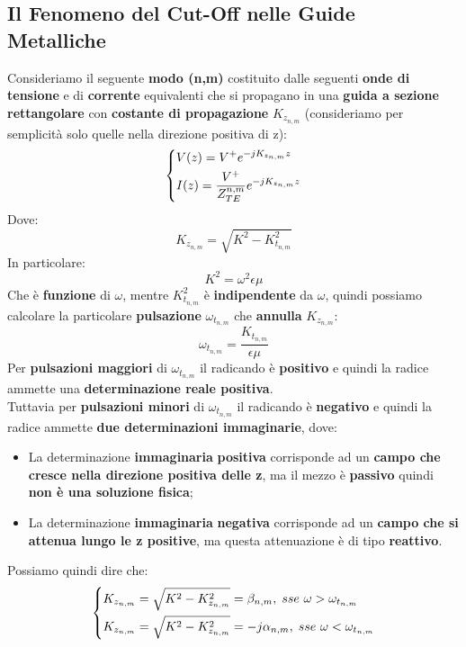 \subsection{Il Fenomeno del Cut-Off nelle Guide Metalliche}
Consideriamo il seguente \textbf{modo (n,m)} costituito dalle seguenti \textbf{onde di tensione} e di \textbf{corrente} equivalenti che si propagano in una \textbf{guida a sezione rettangolare} con \textbf{costante di propagazione} $K_{z_{n,m}}$ (consideriamo per semplicità solo quelle nella direzione positiva di z):
\begin{equation*}
\begin{dcases}
    V(z) = V^+ e^{-jK_{z_{n,m}}z}\\
    I(z) = \frac{V^+}{Z_{TE}^{n,m}} e^{-jK_{z_{n,m}}z}
\end{dcases}
\end{equation*}
Dove:
\begin{equation*}
    K_{z_{n,m}} = \sqrt{K^2 - K_{t_{n,m}}^2}
\end{equation*}
In particolare:
\begin{equation*}
    K^2 = \omega^2 \epsilon \mu 
\end{equation*}
Che è \textbf{funzione} di $\omega$, mentre $K^2_{t_{n,m}}$ è \textbf{indipendente} da $\omega$, quindi possiamo calcolare la particolare \textbf{pulsazione} $\omega_{t_{n,m}}$ che \textbf{annulla} $K_{z_{n,m}}$:
\begin{equation*}
    \omega_{t_{n,m}} = \frac{K_{t_{n,m}}}{\epsilon \mu}
\end{equation*}
Per \textbf{pulsazioni maggiori} di $\omega_{t_{n,m}}$ il radicando è \textbf{positivo} e quindi la radice ammette una \textbf{determinazione reale positiva}.\\ 
Tuttavia per \textbf{pulsazioni minori} di $\omega_{t_{n,m}}$ il radicando è \textbf{negativo} e quindi la radice ammette \textbf{due determinazioni immaginarie}, dove:
\begin{itemize}
    \item La determinazione \textbf{immaginaria} \textbf{positiva} corrisponde ad un \textbf{campo che cresce nella direzione positiva delle z}, ma il mezzo è \textbf{passivo} quindi \textbf{non è una soluzione fisica};
    \item La determinazione \textbf{immaginaria} \textbf{negativa} corrisponde ad un \textbf{campo che si attenua lungo le z positive}, ma questa attenuazione è di tipo \textbf{reattivo}.
\end{itemize}
Possiamo quindi dire che:
\begin{equation*}
\begin{dcases}
    K_{z_{n,m}} = \sqrt{K^2 - K_{z_{n,m}}^2} = \beta_{n,m},\; sse \ \omega > \omega_{t_{n,m}}\\
    K_{z_{n,m}} = \sqrt{K^2 - K_{z_{n,m}}^2} = -j \alpha_{n,m},\; sse \ \omega < \omega_{t_{n,m}}
\end{dcases}
\end{equation*}
